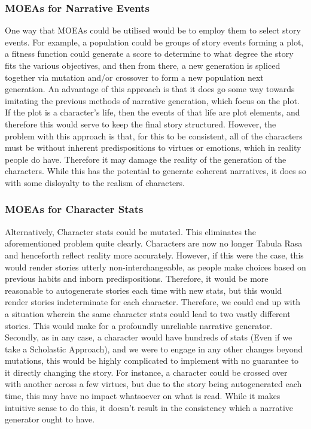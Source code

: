 \documentclass[12pt]{article}
\begin{document}
\subsubsection{MOEAs for Narrative Events}
One way that MOEAs could be utilised would be to employ them to select story events. For example, a population could be groups of story events forming a plot, a fitness function could generate a score to determine to what degree the story fits the various objectives, and then from there, a new generation is spliced together via mutation and/or crossover to form a new population next generation. An advantage of this approach is that it does go some way towards imitating the previous methods of narrative generation, which focus on the plot. If the plot is a character's life, then the events of that life are plot elements, and therefore this would serve to keep the final story structured. However, the problem with this approach is that, for this to be consistent, all of the characters must be without inherent predispositions to virtues or emotions, which in reality people do have. Therefore it may damage the reality of the generation of the characters. While this has the potential to generate coherent narratives, it does so with some disloyalty to the realism of characters.  \\
\subsubsection{MOEAs for Character Stats} 
Alternatively, Character stats could be mutated. This eliminates the aforementioned problem quite clearly. Characters are now no longer Tabula Rasa and henceforth reflect reality more accurately. However, if this were the case, this would render stories utterly non-interchangeable, as people make choices based on previous habits and inborn predispositions. Therefore, it would be more reasonable to autogenerate stories each time with new stats, but this would render stories indeterminate for each character. Therefore, we could end up with a situation wherein the same character stats could lead to two vastly different stories. This would make for a profoundly unreliable narrative generator. Secondly, as in any case, a character would have hundreds of stats (Even if we take a Scholastic Approach), and we were to engage in any other changes beyond mutations, this would be highly complicated to implement with no guarantee to it directly changing the story. For instance, a character could be crossed over with another across a few virtues, but due to the story being autogenerated each time, this may have no impact whatsoever on what is read. While it makes intuitive sense to do this, it doesn't result in the consistency which a narrative generator ought to have. \\
\end{document}
